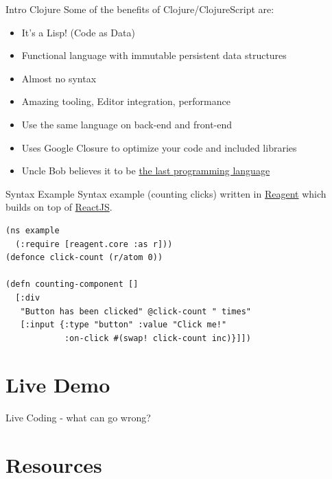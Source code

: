 \documentclass[bigger]{beamer}
\begin{document}
\begin{frame}[label=sec-2-5]{Intro Clojure}
Some of the benefits of Clojure/ClojureScript are:

\begin{itemize}
\item It's a Lisp! (Code as Data)
\item Functional language with immutable persistent data structures
\item Almost no syntax
\item Amazing tooling, Editor integration, performance
\item Use the same language on back-end and front-end
\item Uses Google Closure to optimize your code and included libraries
\item Uncle Bob believes it to be \href{https://skillsmatter.com/skillscasts/2323-bobs-last-language}{the last programming language}
\end{itemize}
\end{frame}

\begin{frame}[fragile,label=sec-2-6]{Syntax Example}
 Syntax example (counting clicks) written in \href{http://reagent-project.github.io/}{Reagent} which builds on
top of \href{https://facebook.github.io/react/}{ReactJS}.

\begin{verbatim}
(ns example
  (:require [reagent.core :as r]))
(defonce click-count (r/atom 0))

(defn counting-component []
  [:div
   "Button has been clicked" @click-count " times"
   [:input {:type "button" :value "Click me!"
            :on-click #(swap! click-count inc)}]])
\end{verbatim}
\end{frame}


\section{Live Demo}
\label{sec-3}

\begin{frame}[label=sec-3-1]{Live Coding - what can go wrong?}
\end{frame}


\section{Resources}
\label{sec-4}
\end{document}
